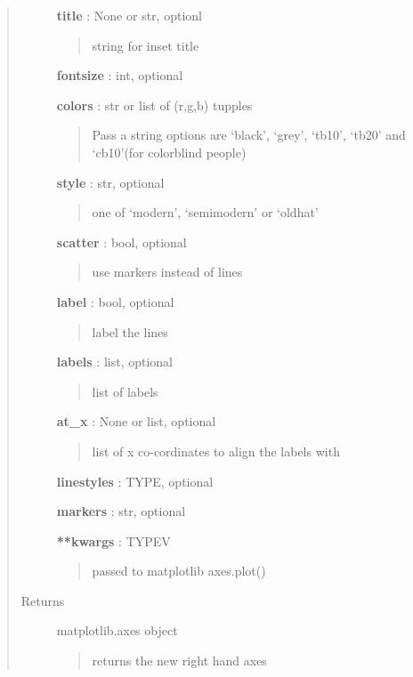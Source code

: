 \documentclass[letterpaper,10pt,english]{sphinxmanual}
\begin{document}
\begin{fulllineitems}
\begin{quote}
\begin{description}
\textbf{title} : None or str, optionl
\begin{quote}

string for inset title
\end{quote}

\textbf{fontsize} : int, optional

\textbf{colors} : str or list of (r,g,b) tupples
\begin{quote}

Pass a string options are `black', `grey', `tb10', `tb20' and `cb10'(for colorblind people)
\end{quote}

\textbf{style} : str, optional
\begin{quote}

one of `modern', `semimodern' or `oldhat'
\end{quote}

\textbf{scatter} : bool, optional
\begin{quote}

use markers instead of lines
\end{quote}

\textbf{label} : bool, optional
\begin{quote}

label the lines
\end{quote}

\textbf{labels} : list, optional
\begin{quote}

list of labels
\end{quote}

\textbf{at\_x} : None or list, optional
\begin{quote}

list of x co-cordinates to align the labels with
\end{quote}

\textbf{linestyles} : TYPE, optional

\textbf{markers} : str, optional

\textbf{**kwargs} : TYPEV
\begin{quote}

passed to matplotlib axes.plot()
\end{quote}

\item[{Returns}] \leavevmode
matplotlib.axes object
\begin{quote}

returns the new right hand axes
\end{quote}

\end{description}\end{quote}

\end{fulllineitems}
\end{document}
